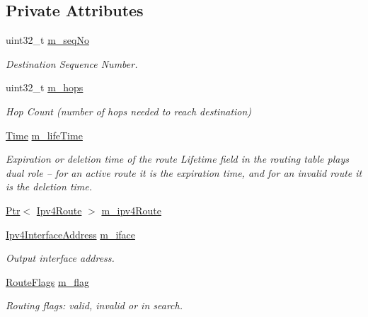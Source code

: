 \subsection*{Private Attributes}
\begin{DoxyCompactItemize}
\item 
uint32\+\_\+t \hyperlink{classns3_1_1dsdv_1_1RoutingTableEntry_a17e9ec058eb434fa4caae105a44756af}{m\+\_\+seq\+No}
\begin{DoxyCompactList}\small\item\em Destination Sequence Number. \end{DoxyCompactList}\item 
uint32\+\_\+t \hyperlink{classns3_1_1dsdv_1_1RoutingTableEntry_adc4e9a8003bcd5664369e04c8b3946c7}{m\+\_\+hops}
\begin{DoxyCompactList}\small\item\em Hop Count (number of hops needed to reach destination) \end{DoxyCompactList}\item 
\hyperlink{classns3_1_1Time}{Time} \hyperlink{classns3_1_1dsdv_1_1RoutingTableEntry_a2d0df3df20b4a89f08a88bc3ccafb331}{m\+\_\+life\+Time}
\begin{DoxyCompactList}\small\item\em Expiration or deletion time of the route Lifetime field in the routing table plays dual role -- for an active route it is the expiration time, and for an invalid route it is the deletion time. \end{DoxyCompactList}\item 
\hyperlink{classns3_1_1Ptr}{Ptr}$<$ \hyperlink{classns3_1_1Ipv4Route}{Ipv4\+Route} $>$ \hyperlink{classns3_1_1dsdv_1_1RoutingTableEntry_aa85a4fd1254650abc9e07e66288ba0bc}{m\+\_\+ipv4\+Route}
\item 
\hyperlink{classns3_1_1Ipv4InterfaceAddress}{Ipv4\+Interface\+Address} \hyperlink{classns3_1_1dsdv_1_1RoutingTableEntry_a8b5be8ca2915535589bb0839a7208aa3}{m\+\_\+iface}
\begin{DoxyCompactList}\small\item\em Output interface address. \end{DoxyCompactList}\item 
\hyperlink{namespacens3_1_1dsdv_aa1c39555b993cc6f56f2c8c6c31e2c3b}{Route\+Flags} \hyperlink{classns3_1_1dsdv_1_1RoutingTableEntry_a6702d7eb273d21926c81518fb400c761}{m\+\_\+flag}
\begin{DoxyCompactList}\small\item\em Routing flags\+: valid, invalid or in search. \end{DoxyCompactList}\item 

\end{DoxyCompactItemize}
